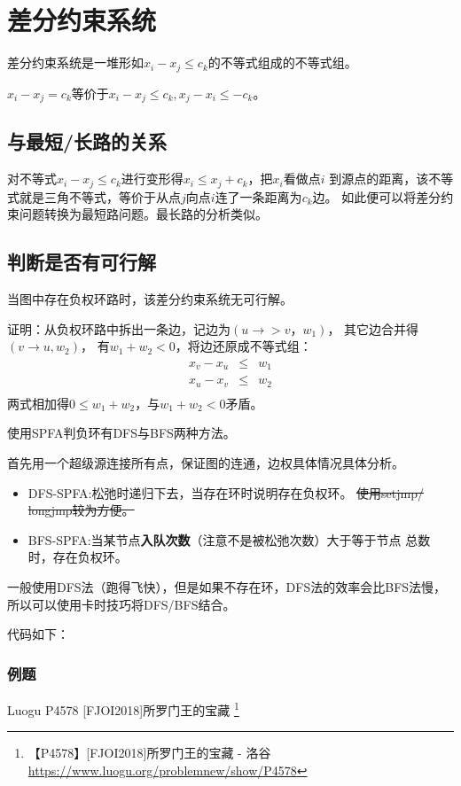 \section{差分约束系统}
差分约束系统是一堆形如$x_i-x_j\leq c_k$的不等式组成的不等式组。

$x_i-x_j=c_k$等价于$x_i-x_j\leq c_k,x_j-x_i\leq -c_k$。

\subsection{与最短/长路的关系}
对不等式$x_i-x_j\leq c_k$进行变形得$x_i\leq x_j+c_k$，把$x_i$看做点$i$
到源点的距离，该不等式就是三角不等式，等价于从点$j$向点$i$连了一条距离为$c_k$边。
如此便可以将差分约束问题转换为最短路问题。最长路的分析类似。

\subsection{判断是否有可行解}

\begin{theorem}
    当图中存在负权环路时，该差分约束系统无可行解。
\end{theorem}

证明：从负权环路中拆出一条边，记边为$(u\rightarrow >v，w_1)$，
其它边合并得$(v\rightarrow u,w_2)$，
有$w_1+w_2<0$，将边还原成不等式组：
\begin{eqnarray*}
    x_v-x_u&\leq& w_1\\
    x_u-x_v&\leq& w_2\\
\end{eqnarray*}
两式相加得$0\leq w_1+w_2$，与$w_1+w_2<0$矛盾。

使用SPFA判负环有DFS与BFS两种方法。

首先用一个超级源连接所有点，保证图的连通，边权具体情况具体分析。

\begin{itemize}
    \item DFS-SPFA:松弛时递归下去，当存在环时说明存在负权环。
    \sout{使用setjmp/\\longjmp较为方便。}
    \item BFS-SPFA:当某节点{\bfseries 入队次数}（注意不是被松弛次数）大于等于节点
    总数时，存在负权环。
\end{itemize}
一般使用DFS法（跑得飞快），但是如果不存在环，DFS法的效率会比BFS法慢，
所以可以使用卡时技巧将DFS/BFS结合。

代码如下：


\subsubsection{例题}
Luogu P4578 [FJOI2018]所罗门王的宝藏
\footnote{【P4578】[FJOI2018]所罗门王的宝藏 - 洛谷
\url{https://www.luogu.org/problemnew/show/P4578}}

